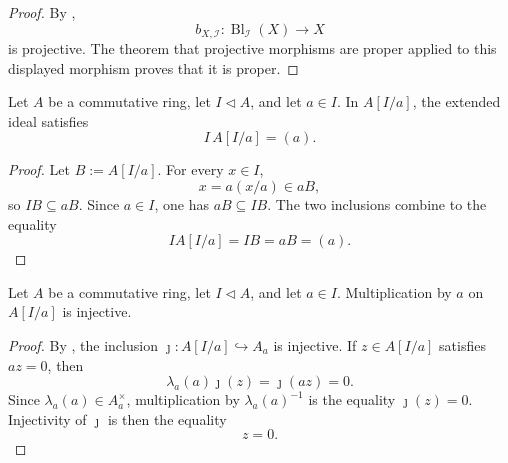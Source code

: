 \begin{proof}
  By ,
  \[
    b_{X,\mathcal I}\colon\operatorname{Bl}_{\mathcal I}(X)\to X
  \]
  is projective.  The theorem that projective morphisms are proper applied to
  this displayed morphism proves that it is proper.
\end{proof}

\begin{lemma}
  \label{lemma:nagata-chart-extended-ideal-principal}

  Let $A$ be a commutative ring, let $I\triangleleft A$, and let $a\in I$.
  In $A[I/a]$, the extended ideal satisfies
  \[
    I\,A[I/a]=(a).
  \]
\end{lemma}

\begin{proof}
  Let $B:=A[I/a]$.  For every $x\in I$,
  \[
    x=a(x/a)\in aB,
  \]
  so $IB\subseteq aB$.  Since $a\in I$, one has $aB\subseteq IB$.
  The two inclusions combine to the equality
  \[
    IA[I/a]=IB=aB=(a).
  \]
\end{proof}

\begin{lemma}
  \label{lemma:nagata-chart-generator-regular}

  Let $A$ be a commutative ring, let $I\triangleleft A$, and let $a\in I$.
  Multiplication by $a$ on $A[I/a]$ is injective.
\end{lemma}

\begin{proof}
  By , the inclusion
  $\jmath\colon A[I/a]\hookrightarrow A_a$ is injective.  If
  $z\in A[I/a]$ satisfies $az=0$, then
  \[
    \lambda_a(a)\jmath(z)=\jmath(az)=0.
  \]
  Since $\lambda_a(a)\in A_a^\times$, multiplication by
  $\lambda_a(a)^{-1}$ is the equality $\jmath(z)=0$.  Injectivity of
  $\jmath$ is then the equality
  \[
    z=0.
  \]
\end{proof}

